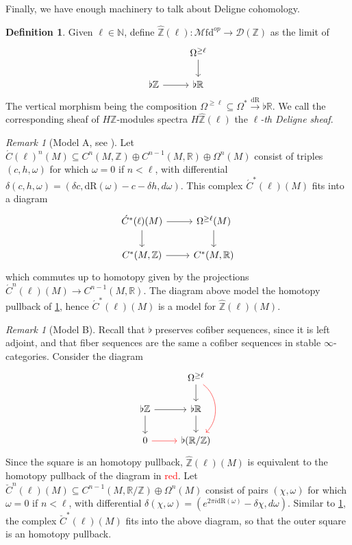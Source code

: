 \documentclass[10pt]{amsart}
\newcommand{\D}{\mathscr{D}}
\newcommand{\bN}{\mathbb{N}}
\newcommand{\bR}{\mathbb{R}}
\newcommand{\bZ}{\mathbb{Z}}
\newcommand{\Mfd}{\mathscr{M}\mathrm{fd}}
\newcommand{\dr}{\mathrm{dR}}
\theoremstyle{definition}
\newtheorem{definition}[equation]{Definition}
\theoremstyle{remark}
\newtheorem{remark}[equation]{Remark}
\numberwithin{equation}{section}
\begin{document}
Finally, we have enough machinery to talk about Deligne cohomology. 
\begin{definition}\label{def:deligne}
  Given $\ell\in\bN$, define $\hat{\bZ}(\ell):\Mfd^{op}\to\D(\bZ)$ as the limit of 
  \[\begin{tikzcd}
     & \Omega^{\geq \ell}\arrow[d] \\
    \flat\bZ \arrow[r] & \flat\bR
  \end{tikzcd}\]
  The vertical morphism being the composition $\Omega^{\geq \ell}\subseteq\Omega^*\xrightarrow{\dr}\flat\bR$. We call the corresponding sheaf of $H\bZ$-modules spectra $H\hat{\bZ}(\ell)$ the $\ell$\emph{-th Deligne sheaf}.
\end{definition}
\begin{remark}[Model A, see {\cite[\S 3.2]{hopkinssinger2005diffcoh}}]\label{rmk:A} Let $\acute{C}(\ell)^n(M)\subseteq C^n(M,\bZ)\oplus C^{n-1}(M,\bR)\oplus\Omega^n(M)$ consist of triples $(c,h,\omega)$ for which $\omega=0$ if $n<\ell$, with differential $\delta(c,h,\omega)=(\delta c,\dr(\omega)-c-\delta h,d\omega)$. This complex $\acute{C}^*(\ell)(M)$ fits into a diagram
\[\begin{tikzcd}
    \acute{C}^*(\ell)(M) \arrow[d]\arrow[r] & \Omega^{\geq \ell}(M)\arrow[d] \\
    C^*(M,\bZ) \arrow[r] & C^*(M,\bR)
  \end{tikzcd}\]which commutes up to homotopy given by the projections $\acute{C}^n(\ell)(M)\to C^{n-1}(M,\bR)$. The diagram above model the homotopy pullback of \cref{def:deligne}, hence $\acute{C}^*(\ell)(M)$ is a model for $\hat{\bZ}(\ell)(M)$. 
\end{remark}
\begin{remark}[Model B]\label{rmk:B} Recall that $\flat$ preserves cofiber sequences, since it is left adjoint, and that fiber sequences are the same a cofiber sequences in stable $\infty$-categories. Consider the diagram
  \[\begin{tikzcd}
     & \Omega^{\geq \ell}\arrow[d]\arrow[dd,bend left=5em,color=red] \\
    \flat\bZ \arrow[r]\arrow[d] & \flat\bR\arrow[d] \\
    0\arrow[r,color=red] & \flat(\bR/\bZ)
  \end{tikzcd}\]
  Since the square is an homotopy pullback, $\hat{\bZ}(\ell)(M)$ is equivalent to the homotopy pullback of the diagram in \textcolor{red}{red}. Let $\breve{C}^{n}(\ell)(M)\subseteq C^{n-1}(M,\bR/\bZ)\oplus\Omega^n(M)$ consist of pairs $(\chi,\omega)$ for which $\omega=0$ if $n<\ell$, with differential $\delta(\chi,\omega)=(e^{2\pi i\dr(\omega)}-\delta\chi,d\omega)$. Similar to \cref{rmk:A}, the complex $\breve{C}^*(\ell)(M)$ fits into the above diagram, so that the outer square is an homotopy pullback.
\end{remark}
\end{document}

